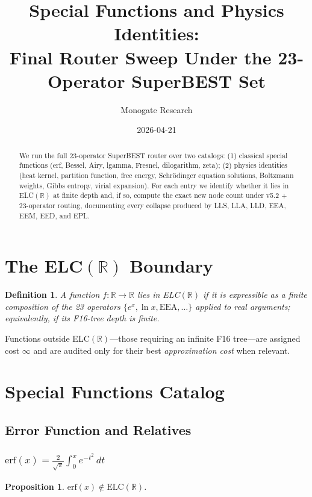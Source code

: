 \documentclass[11pt]{article}
\title{Special Functions and Physics Identities:\\
Final Router Sweep Under the 23-Operator SuperBEST Set}
\author{Monogate Research}
\date{2026-04-21}
\newtheorem{proposition}[theorem]{Proposition}
\newtheorem{definition}[theorem]{Definition}
\begin{document}
\maketitle

\begin{abstract}
We run the full 23-operator SuperBEST router over two catalogs:
(1) classical special functions (erf, Bessel, Airy, lgamma, Fresnel, dilogarithm, zeta);
(2) physics identities (heat kernel, partition function, free energy, Schrödinger equation solutions,
Boltzmann weights, Gibbs entropy, virial expansion).
For each entry we identify whether it lies in ELC$(\mathbb{R})$ at finite depth
and, if so, compute the exact new node count under v5.2 + 23-operator routing,
documenting every collapse produced by LLS, LLA, LLD, EEA, EEM, EED, and EPL.
\end{abstract}

\section{The ELC$(\mathbb{R})$ Boundary}

\begin{definition}
A function $f:\mathbb{R}\to\mathbb{R}$ lies in \emph{ELC$(\mathbb{R})$} if it is
expressible as a finite composition of the 23 operators $\{e^x, \ln x, \mathrm{EEA},\ldots\}$
applied to real arguments; equivalently, if its F16-tree depth is finite.
\end{definition}

Functions outside ELC$(\mathbb{R})$---those requiring an infinite F16 tree---are assigned
cost $\infty$ and are audited only for their best \emph{approximation cost} when relevant.

\section{Special Functions Catalog}

\subsection{Error Function and Relatives}

\subsubsection{$\mathrm{erf}(x) = \frac{2}{\sqrt\pi}\int_0^x e^{-t^2}\,dt$}

\begin{proposition}
$\mathrm{erf}(x)\notin\mathrm{ELC}(\mathbb{R})$.
\end{proposition}
\end{document}
